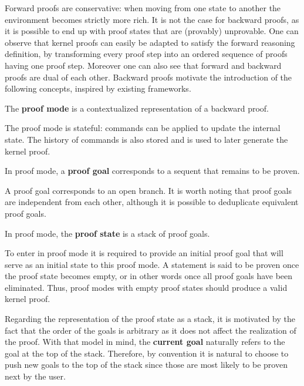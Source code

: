 Forward proofs are conservative: when moving from one state to another the environment becomes strictly more rich. It is not the case for backward proofs, as it is possible to end up with proof states that are (provably) unprovable. One can observe that kernel proofs can easily be adapted to satisfy the forward reasoning definition, by transforming every proof step into an ordered sequence of proofs having one proof step. Moreover one can also see that forward and backward proofs are dual of each other. Backward proofs motivate the introduction of the following concepts, inspired by existing frameworks.

\begin{definition}
The \textbf{proof mode} is a contextualized representation of a backward proof.
\end{definition}

The proof mode is stateful: commands can be applied to update the internal state. The history of commands is also stored and is used to later generate the kernel proof.

\begin{definition}
In proof mode, a \textbf{proof goal} corresponds to a sequent that remains to be proven.
\end{definition}

A proof goal corresponds to an open branch. It is worth noting that proof goals are independent from each other, although it is possible to deduplicate equivalent proof goals.

\begin{definition}
In proof mode, the \textbf{proof state} is a stack of proof goals.
\end{definition}

To enter in proof mode it is required to provide an initial proof goal that will serve as an initial state to this proof mode. A statement is said to be proven once the proof state becomes empty, or in other words once all proof goals have been eliminated. Thus, proof modes with empty proof states should produce a valid kernel proof.

Regarding the representation of the proof state as a stack, it is motivated by the fact that the order of the goals is arbitrary as it does not affect the realization of the proof. With that model in mind, the \textbf{current goal} naturally refers to the goal at the top of the stack. Therefore, by convention it is natural to choose to push new goals to the top of the stack since those are most likely to be proven next by the user.

